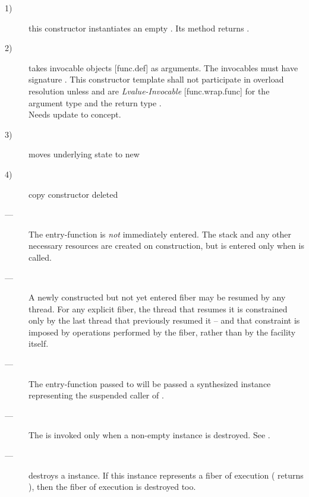\begin{description}
    \item[1)] this constructor instantiates an empty \fiber. Its  method
              returns .
    \item[2)] takes invocable objects [func.def] as
              arguments. The invocables must have signature . This constructor template shall not
              participate in overload resolution unless  and 
              are \emph{Lvalue-Invocable} [func.wrap.func] for the argument
              type  and the return type \fiber.\\
               Needs update to  concept.
    \item[3)] moves underlying state to new \fiber
    \item[4)] copy constructor deleted
\end{description}

\remarks
\begin{description}
    \item[---] The entry-function  is \emph{not} immediately entered.
              The stack and any other necessary resources are created
              on construction, but  is entered
              only when \allresume is called.
    \item[---] A newly constructed but not yet entered fiber may be resumed by
              any thread. For any explicit fiber, the thread that resumes it
              is constrained only by the last thread that previously resumed
              it -- and that constraint is imposed by operations performed by
              the fiber, rather than by the \fiber facility itself.
    \item[---] The entry-function  passed to \fiber
              will be passed a synthesized \fiber instance representing the
              suspended caller of \allresume.
    \item[---] The \cancelfn {} is invoked only when a non-empty
              \fiber instance is destroyed. See .
\end{description}


\effects
\begin{description}
    \item[---] destroys a \fiber instance. If this instance represents a fiber
              of execution ( returns ), then the fiber of
              execution is destroyed too.
\end{description}

